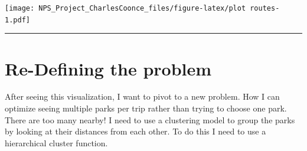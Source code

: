 \documentclass[
]{article}
\begin{document}
\texttt{[image: NPS\_Project\_CharlesCoonce\_files/figure-latex/plot routes-1.pdf]}

\begin{center}\rule{0.5\linewidth}{0.5pt}\end{center}

\label{cluster_parks}
\section{Re-Defining the problem}\label{re-defining-the-problem}

After seeing this visualization, I want to pivot to a new problem. How I
can optimize seeing multiple parks per trip rather than trying to choose
one park. There are too many nearby! I need to use a clustering model to
group the parks by looking at their distances from each other. To do
this I need to use a hierarchical cluster function.
\end{document}
